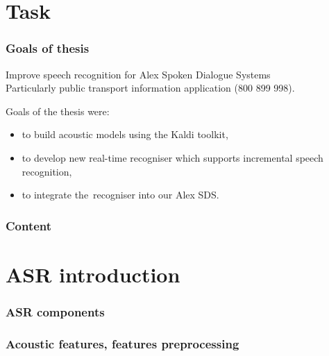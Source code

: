 

\maketitle


\section{Task} %

\begin{frame}\frametitle{Goals of thesis} 
    Improve speech recognition for Alex Spoken Dialogue Systems \\
    Particularly public transport information application (800 899 998).
    \begin{exampleblock}
        Goals of the thesis were:
        \begin{itemize}
            \item to build acoustic models using the Kaldi toolkit,
            \item to develop new real-time recogniser which supports incremental speech recognition,
            \item to integrate the~recogniser into our Alex SDS.
        \end{itemize}
    \end{exampleblock}
\end{frame}

\begin{frame} \frametitle{Content} \tableofcontents \end{frame}

\section{ASR introduction} %

\begin{frame}\frametitle{ASR components} 
    
\end{frame}

\begin{frame}\frametitle{Acoustic features, features preprocessing} 
    
    
\end{frame}


